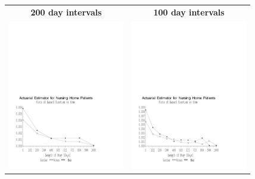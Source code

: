 \documentclass[11pt,psfig]{book}
\begin{document}
\begin{center}
\begin{tabular}{cc}
{\bf 200 day intervals} & {\bf 100 day intervals}\\
\includegraphics[width=2in]{hazards_nh1.pdf} &
\includegraphics[width=2in]{hazards_nh2.pdf}
\end{tabular}
\end{center}
\end{document}
